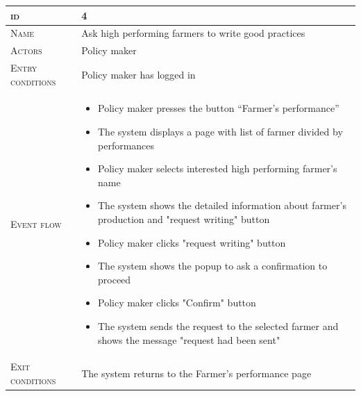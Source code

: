 \begin{table}[H]
    \centering
    \begin{tabular}{|l|p{}|}
        \hline %
    	\textsc{id}                 &   4\\
    	\hline %
    	\textsc{Name}               &   Ask high performing farmers to write good practices\\
    	\hline %
    	\textsc{Actors}             &   Policy maker\\
    	\hline %
    	\textsc{Entry conditions}   &   Policy maker has logged in\\
    	\hline %
    	\textsc{Event flow}         &   %
            	                        \begin{itemize}
                                    	    \item Policy maker presses the button “Farmer’s performance”
                                    		\item The system displays a page with list of farmer divided by performances
                                    		\item Policy maker selects interested high performing farmer’s name
                                    		\item The system shows the detailed information about farmer’s production and "request writing" button
                                    		\item Policy maker clicks "request writing" button
                                    		\item The system shows the popup to ask a confirmation to proceed
                                    		\item Policy maker clicks "Confirm" button
                                    		\item The system sends the request to the selected farmer and shows the message "request had been sent" 
                                        \end{itemize}\\
        \hline %
        \textsc{Exit conditions}    &  The system returns to the Farmer’s performance page\\

\end{tabular}
\end{table}

